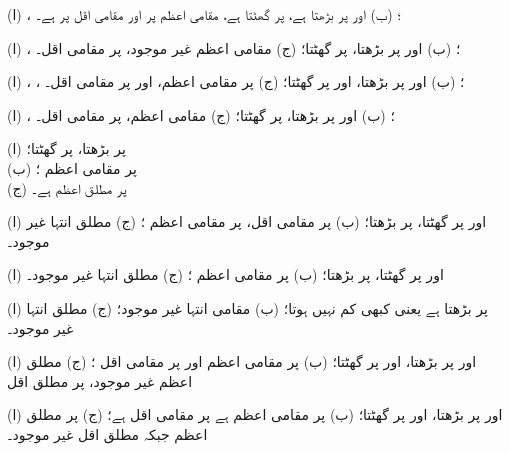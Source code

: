 \begin {description}\setlength {\parskip }{0pt} \setlength {\itemsep }{0pt plus 1pt}
\item [
\protect ۱)
]
 (ا) ، ؛ (ب)  اور  پر بڑھتا ہے،  پر گھٹتا ہے، مقامی اعظم  پر اور مقامی اقل  پر ہے۔ 
\item [
\protect ۳)
]
 (ا) ، ؛ (ب)  اور  پر بڑھتا،  پر گھٹتا؛ (ج) مقامی اعظم غیر موجود،  پر مقامی اقل۔ 
\item [
\protect ۵)
]
 (ا) ، ، ؛ (ب)  اور  پر بڑھتا،  اور  پر گھٹتا؛ (ج)  پر مقامی اعظم،  اور  پر مقامی اقل۔ 
\item [
\protect ۷)
]
 (ا) ، ؛ (ب)  اور  پر بڑھتا،  پر گھٹتا؛ (ج)  مقامی اعظم،  پر مقامی اقل۔ 
\item [
\protect ۹)
]
 (ا)  پر بڑھتا،  پر گھٹتا؛ \\ (ب)  پر مقامی اعظم ؛\\ (ج)  پر مطلق اعظم  ہے۔ 
\item [
\protect ۱۱)
]
 (ا)  اور  پر گھٹتا،  پر بڑھتا؛ (ب)  پر مقامی اقل،  پر مقامی اعظم ؛ (ج) مطلق انتہا غیر موجود۔ 
\item [
\protect ۱۳)
]
 (ا)  اور  پر گھٹتا،  پر بڑھتا؛ (ب)  پر مقامی اعظم ؛ (ج) مطلق انتہا غیر موجود۔ 
\item [
\protect ۱۵)
]
 (ا)  پر بڑھتا ہے یعنی کبھی کم نہیں ہوتا؛ (ب) مقامی انتہا غیر موجود؛ (ج) مطلق انتہا غیر موجود۔ 
\item [
\protect ۱۷)
]
 (ا)  اور  پر بڑھتا،  اور  پر گھٹتا؛ (ب)  پر مقامی اعظم  اور  پر مقامی اقل ؛ (ج) مطلق اعظم غیر موجود،  پر مطلق اقل  
\item [
\protect ۱۹)
]
 (ا)  اور  پر بڑھتا،  اور  پر گھٹتا؛ (ب)  پر مقامی اعظم  ہے  پر مقامی اقل  ہے؛ (ج)  پر مطلق اعظم جبکہ مطلق اقل غیر موجود۔ 

\end{description}
